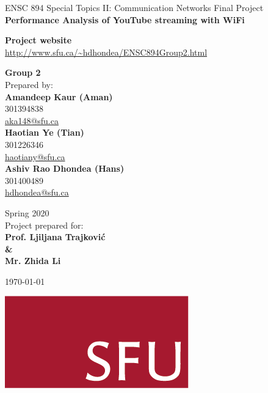 \thispagestyle{empty}			
{\Large \begin{center}			
ENSC 894 Special Topics II: Communication Networks Final Project \\
\textbf{Performance Analysis of YouTube streaming with WiFi}
\vskip 23mm
\end{center}}

\begin{center}
	\textbf{Project website} \\
	\url{http://www.sfu.ca/~hdhondea/ENSC894Group2.html}
\end{center}

\begin{center}	
\textbf{Group 2} \\				
Prepared by:\\
\textbf{Amandeep Kaur (Aman)}\\
301394838\\
\url{aka148@sfu.ca} \\
\textbf{Haotian Ye (Tian)}\\
301226346\\
\url{haotiany@sfu.ca}\\
\textbf{Ashiv Rao Dhondea (Hans)}\\
301400489\\
\url{hdhondea@sfu.ca} 

\vskip 12mm
\vskip 5mm

Spring 2020\\Project prepared for:\\
\textbf{
Prof. Ljiljana Trajkovi\'{c}\\
\& \\
Mr. Zhida Li}
\end{center}

\begin{center}
	{\today}
\end{center}

\begin{center}				
	\includegraphics[scale = 1]{Figures/SFUogo.png}
\end{center}
